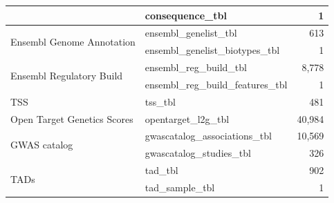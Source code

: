\begin{table}[h!]
\begin{tabular}{l|l|r}
                                                   & consequence\_tbl                   & 1                                                                                                   \\ \hline
        \multirow{2}{*}{Ensembl Genome Annotation} & ensembl\_genelist\_tbl             & 613                                                                                                 \\
                                                   & ensembl\_genelist\_biotypes\_tbl   & 1                                                                                                   \\ \hline
        \multirow{2}{*}{Ensembl Regulatory Build}  & ensembl\_reg\_build\_tbl           & 8,778                                                                                                \\
                                                   & ensembl\_reg\_build\_features\_tbl & 1                                                                                                   \\ \hline
        TSS                                        & tss\_tbl                           & 481                                                                                                 \\ \hline
        Open Target Genetics Scores                & opentarget\_l2g\_tbl               & 40,984                                                                                               \\ \hline
        \multirow{2}{*}{GWAS catalog}              & gwascatalog\_associations\_tbl     & 10,569                                                                                               \\
                                                   & gwascatalog\_studies\_tbl          & 326                                                                                                 \\ \hline
        \multirow{2}{*}{TADs}                      & tad\_tbl                           & 902                                                                                                 \\
                                                   & tad\_sample\_tbl                   & 1                                                                                                   \\ \hline

\end{tabular}
\end{table}
